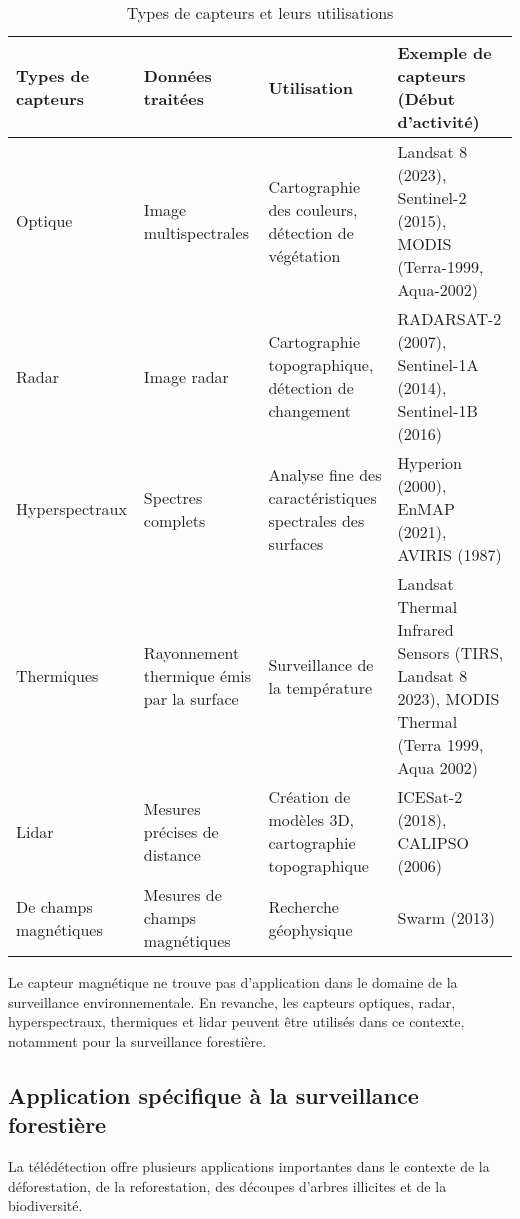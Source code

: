 \begin{table}[H]
	\centering
	\caption{Types de capteurs et leurs utilisations}
	\vspace{5mm}
	\begin{tabular}[c]{|>{\centering\arraybackslash}p{2.5cm}|>{\centering\arraybackslash}p{3.5cm}|>{\centering\arraybackslash}p{4cm}|>{\centering\arraybackslash}p{5cm}|}
		\hline
		\rule[0.5cm]{0cm}{0cm} Types de capteurs & Données traitées & Utilisation & Exemple de capteurs (Début d’activité) \\
		\hline
		\rule[0.5cm]{0cm}{0cm} Optique & Image multispectrales & Cartographie des couleurs, détection de végétation & Landsat 8 (2023), Sentinel-2 (2015), MODIS (Terra-1999, Aqua-2002) \\
		\hline
		\rule[0.5cm]{0cm}{0cm} Radar & Image radar & Cartographie topographique, détection de changement & RADARSAT-2 (2007), Sentinel-1A (2014), Sentinel-1B (2016) \\
		\hline
		\rule[0.5cm]{0cm}{0cm} Hyperspectraux & Spectres complets & Analyse fine des caractéristiques spectrales des surfaces & Hyperion (2000), EnMAP (2021), AVIRIS (1987) \\
		\hline
		\rule[0.5cm]{0cm}{0cm} Thermiques & Rayonnement thermique émis par la surface & Surveillance de la température & Landsat Thermal Infrared Sensors (TIRS, Landsat 8 2023), MODIS Thermal (Terra 1999, Aqua 2002) \\
		\hline
		\rule[0.5cm]{0cm}{0cm} Lidar & Mesures précises de distance & Création de modèles 3D, cartographie topographique & ICESat-2 (2018), CALIPSO (2006) \\
		\hline
		\rule[0.5cm]{0cm}{0cm} De champs magnétiques & Mesures de champs magnétiques & Recherche géophysique & Swarm (2013) \\
		\hline
	\end{tabular}
\end{table}


Le capteur magnétique ne trouve pas d'application dans le domaine de la surveillance environnementale. En revanche, les capteurs optiques, radar, hyperspectraux, thermiques et lidar peuvent être utilisés dans ce contexte, notamment pour la surveillance forestière.
\\

\subsection{Application spécifique à la surveillance forestière}
La télédétection offre plusieurs applications importantes dans le contexte de la déforestation, de la reforestation, des découpes d'arbres illicites et de la biodiversité. 

